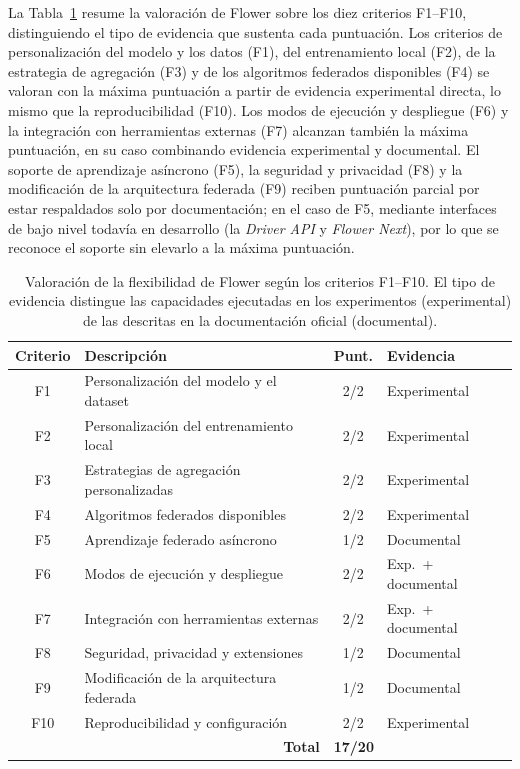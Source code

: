 La Tabla~\ref{tab:flex-flower-score} resume la valoración de Flower sobre los diez
criterios F1--F10, distinguiendo el tipo de evidencia que sustenta cada
puntuación. Los criterios de personalización del modelo y los datos (F1), del
entrenamiento local (F2), de la estrategia de agregación (F3) y de los algoritmos
federados disponibles (F4) se valoran con la máxima puntuación a partir de
evidencia experimental directa, lo mismo que la reproducibilidad (F10). Los modos
de ejecución y despliegue (F6) y la integración con herramientas externas (F7)
alcanzan también la máxima puntuación, en su caso combinando evidencia experimental
y documental.
El soporte de aprendizaje asíncrono (F5), la seguridad y privacidad (F8) y la
modificación de la arquitectura federada (F9) reciben puntuación parcial por estar
respaldados solo por documentación; en el caso de F5, mediante interfaces de bajo
nivel todavía en desarrollo (la \textit{Driver API} y \textit{Flower Next}), por lo
que se reconoce el soporte sin elevarlo a la máxima puntuación.

\begin{table}[htbp]
  \centering
  \caption{Valoración de la flexibilidad de Flower según los criterios F1--F10.
  El tipo de evidencia distingue las capacidades ejecutadas en los experimentos
  (experimental) de las descritas en la documentación oficial (documental).}
  \label{tab:flex-flower-score}
  \begin{tabular}{clcl}
    \toprule
    \textbf{Criterio} & \textbf{Descripción} & \textbf{Punt.} & \textbf{Evidencia} \\
    \midrule
    F1  & Personalización del modelo y el dataset      & 2/2 & Experimental \\
    F2  & Personalización del entrenamiento local      & 2/2 & Experimental \\
    F3  & Estrategias de agregación personalizadas     & 2/2 & Experimental \\
    F4  & Algoritmos federados disponibles             & 2/2 & Experimental \\
    F5  & Aprendizaje federado asíncrono               & 1/2 & Documental \\
    F6  & Modos de ejecución y despliegue              & 2/2 & Exp.\ + documental \\
    F7  & Integración con herramientas externas        & 2/2 & Exp.\ + documental \\
    F8  & Seguridad, privacidad y extensiones          & 1/2 & Documental \\
    F9  & Modificación de la arquitectura federada     & 1/2 & Documental \\
    F10 & Reproducibilidad y configuración             & 2/2 & Experimental \\
    \midrule
    \multicolumn{2}{r}{\textbf{Total}} & \multicolumn{2}{l}{\textbf{17/20}} \\
    \bottomrule
  \end{tabular}
\end{table}

